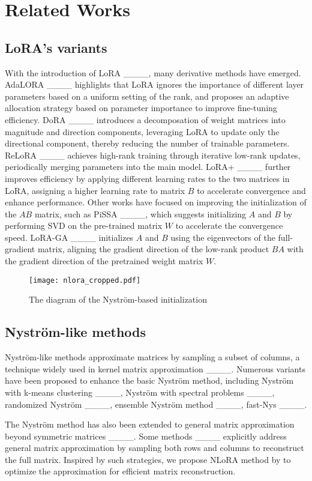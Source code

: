 \section{Related Works}

\subsection{LoRA's variants} 
With the introduction of LoRA ____, many derivative methods have emerged. 
AdaLORA ____ highlights that LoRA ignores the importance of different layer parameters based on a uniform setting of the rank, and proposes an adaptive allocation strategy based on parameter importance to improve fine-tuning efficiency.
DoRA ____ introduces a decomposation of weight matrices into magnitude and direction components, leveraging LoRA to update only the directional component, thereby reducing the number of trainable parameters. ReLoRA ____ achieves high-rank training through iterative low-rank updates, periodically merging parameters into the main model. LoRA+ ____ further improves efficiency by applying different learning rates to the two matrices in LoRA, assigning a higher learning rate to matrix \(B\) to accelerate convergence and enhance performance.   Other works have focused on improving the initialization of the \(AB\) matrix, such as PiSSA ____, which suggests initializing \(A\) and \(B\) by performing SVD on the pre-trained matrix \(W\) to accelerate the convergence speed. LoRA-GA ____ initializes \(A\) and \(B\) using the eigenvectors of the full-gradient matrix, aligning the gradient direction of the low-rank product \(BA\) with the gradient direction of the pretrained weight matrix \(W\).
\begin{figure*}[]
\centering
\texttt{[image: nlora\_cropped.pdf]} 
\caption{The diagram of the Nyström-based initialization}
\label{figure:nlora}
\end{figure*}
\subsection{Nyström-like methods}
Nyström-like methods approximate matrices by sampling a subset of columns, a technique widely used in kernel matrix approximation ____. Numerous variants have been proposed to enhance the basic Nyström method, including Nyström with k-means clustering ____, Nyström with spectral problems ____, randomized Nyström ____, ensemble Nyström method ____, fast-Nys ____.

The Nyström method has also been extended to general matrix approximation beyond symmetric matrices ____. Some methods ____ explicitly address general matrix approximation by sampling both rows and columns to reconstruct the full matrix. Inspired by such strategies, we propose NLoRA method by to optimize the approximation for efficient matrix reconstruction.